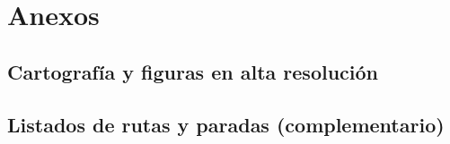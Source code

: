 \chapter*{Anexos}
    \section{Cartografía y figuras en alta resolución}
    \section{Listados de rutas y paradas (complementario)}
